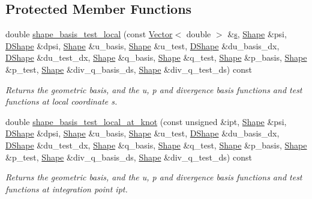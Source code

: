 \subsection*{Protected Member Functions}
\begin{DoxyCompactItemize}
\item 
double \hyperlink{classoomph_1_1TPoroelasticityElement_a309bfa8c38a43d062ffe7395e32e6d5f}{shape\+\_\+basis\+\_\+test\+\_\+local} (const \hyperlink{classoomph_1_1Vector}{Vector}$<$ double $>$ \&\hyperlink{cfortran_8h_ab7123126e4885ef647dd9c6e3807a21c}{s}, \hyperlink{classoomph_1_1Shape}{Shape} \&psi, \hyperlink{classoomph_1_1DShape}{D\+Shape} \&dpsi, \hyperlink{classoomph_1_1Shape}{Shape} \&u\+\_\+basis, \hyperlink{classoomph_1_1Shape}{Shape} \&u\+\_\+test, \hyperlink{classoomph_1_1DShape}{D\+Shape} \&du\+\_\+basis\+\_\+dx, \hyperlink{classoomph_1_1DShape}{D\+Shape} \&du\+\_\+test\+\_\+dx, \hyperlink{classoomph_1_1Shape}{Shape} \&q\+\_\+basis, \hyperlink{classoomph_1_1Shape}{Shape} \&q\+\_\+test, \hyperlink{classoomph_1_1Shape}{Shape} \&p\+\_\+basis, \hyperlink{classoomph_1_1Shape}{Shape} \&p\+\_\+test, \hyperlink{classoomph_1_1Shape}{Shape} \&div\+\_\+q\+\_\+basis\+\_\+ds, \hyperlink{classoomph_1_1Shape}{Shape} \&div\+\_\+q\+\_\+test\+\_\+ds) const
\begin{DoxyCompactList}\small\item\em Returns the geometric basis, and the u, p and divergence basis functions and test functions at local coordinate s. \end{DoxyCompactList}\item 
double \hyperlink{classoomph_1_1TPoroelasticityElement_a26cc12dec0a90720215f1d12d60ce936}{shape\+\_\+basis\+\_\+test\+\_\+local\+\_\+at\+\_\+knot} (const unsigned \&ipt, \hyperlink{classoomph_1_1Shape}{Shape} \&psi, \hyperlink{classoomph_1_1DShape}{D\+Shape} \&dpsi, \hyperlink{classoomph_1_1Shape}{Shape} \&u\+\_\+basis, \hyperlink{classoomph_1_1Shape}{Shape} \&u\+\_\+test, \hyperlink{classoomph_1_1DShape}{D\+Shape} \&du\+\_\+basis\+\_\+dx, \hyperlink{classoomph_1_1DShape}{D\+Shape} \&du\+\_\+test\+\_\+dx, \hyperlink{classoomph_1_1Shape}{Shape} \&q\+\_\+basis, \hyperlink{classoomph_1_1Shape}{Shape} \&q\+\_\+test, \hyperlink{classoomph_1_1Shape}{Shape} \&p\+\_\+basis, \hyperlink{classoomph_1_1Shape}{Shape} \&p\+\_\+test, \hyperlink{classoomph_1_1Shape}{Shape} \&div\+\_\+q\+\_\+basis\+\_\+ds, \hyperlink{classoomph_1_1Shape}{Shape} \&div\+\_\+q\+\_\+test\+\_\+ds) const
\begin{DoxyCompactList}\small\item\em Returns the geometric basis, and the u, p and divergence basis functions and test functions at integration point ipt. \end{DoxyCompactList}\end{DoxyCompactItemize}
